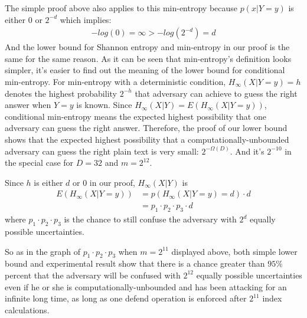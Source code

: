 \documentclass[10pt, conference, compsocconf]{IEEEtran}
\begin{document}
	The simple proof above also applies to this min-entropy
	because $p(x | Y = y)$ is either $0$ or $2^{-d}$ which implies:
	\begin{align*}
		-log(0) = \infty > -log(2^{-d}) = d
	\end{align*}
	And the lower bound for Shannon entropy and min-entropy 
	in our proof is the same for the same reason.
	As it can be seen that min-entropy's definition looks simpler, 
	it's easier to find out the meaning of the lower
	bound for conditional min-entropy. For min-entropy with a deterministic condition,
	$H_\infty(X | Y = y) = h$
	denotes the highest probability $2^{-h}$ that adversary can achieve to guess
	the right answer when $Y = y$ is known.
	Since $H_\infty(X | Y) = E\left(H_\infty(X | Y = y)\right)$,
	conditional min-entropy means the expected highest
	possibility that one adversary can guess the right answer.
	Therefore, the proof of our lower bound shows that
	the expected highest possibility that a computationally-unbounded
	adversary can guess the right plain text is very small: $2^{-\Omega(D)}$.
	And it's $2^{-10}$ in the special case for $D = 32$ and $m = 2^{12}$.
	
	Since $h$ is either $d$ or $0$ in our proof,
	$H_\infty(X | Y)$ is
	\begin{align*}
		E\left(H_\infty(X | Y = y)\right) &= p\left(H_\infty(X | Y = y) = d\right) \cdot d\\
		 &= p_1 \cdot p_2 \cdot p_3 \cdot d
	\end{align*}
	where $p_1 \cdot p_2 \cdot p_3$ is the chance to still confuse the adversary with 
	$2^d$ equally possible uncertainties.
	
	So as in the graph of $p_1 \cdot p_2 \cdot p_3$ when 
	$m = 2^{11}$ displayed above, both simple lower
	bound and experimental result show that
	there is a chance greater than $95\%$ percent that the adversary
	will be confused with $2^{12}$ equally possible uncertainties
	even if he or she is computationally-unbounded and has been attacking
	for an infinite long time, as long as one defend operation is enforced
	after $2^{11}$ index calculations.

%
%
\end{document}
